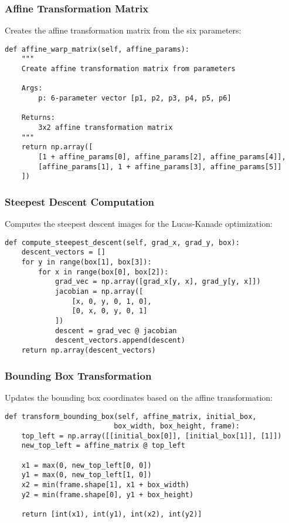 \documentclass[12pt,a4paper]{article}
\begin{document}
\subsubsection{Affine Transformation Matrix}
Creates the affine transformation matrix from the six parameters:

\begin{lstlisting}[caption=Affine Transformation Matrix]
def affine_warp_matrix(self, affine_params):
    """
    Create affine transformation matrix from parameters
    
    Args:
        p: 6-parameter vector [p1, p2, p3, p4, p5, p6]
        
    Returns:
        3x2 affine transformation matrix
    """
    return np.array([
        [1 + affine_params[0], affine_params[2], affine_params[4]],
        [affine_params[1], 1 + affine_params[3], affine_params[5]]
    ])
\end{lstlisting}

\vspace{\baselineskip}










\subsubsection{Steepest Descent Computation}
Computes the steepest descent images for the Lucas-Kanade optimization:

\begin{lstlisting}[caption=Steepest Descent Computation]
def compute_steepest_descent(self, grad_x, grad_y, box):
    descent_vectors = []
    for y in range(box[1], box[3]):
        for x in range(box[0], box[2]):
            grad_vec = np.array([grad_x[y, x], grad_y[y, x]])
            jacobian = np.array([
                [x, 0, y, 0, 1, 0],
                [0, x, 0, y, 0, 1]
            ])
            descent = grad_vec @ jacobian
            descent_vectors.append(descent)
    return np.array(descent_vectors)
\end{lstlisting}

\subsubsection{Bounding Box Transformation}
Updates the bounding box coordinates based on the affine transformation:

\begin{lstlisting}[caption=Bounding Box Transformation]
def transform_bounding_box(self, affine_matrix, initial_box, 
                          box_width, box_height, frame):
    top_left = np.array([[initial_box[0]], [initial_box[1]], [1]])
    new_top_left = affine_matrix @ top_left

    x1 = max(0, new_top_left[0, 0])
    y1 = max(0, new_top_left[1, 0])
    x2 = min(frame.shape[1], x1 + box_width)
    y2 = min(frame.shape[0], y1 + box_height)

    return [int(x1), int(y1), int(x2), int(y2)]
\end{lstlisting}
\end{document}
